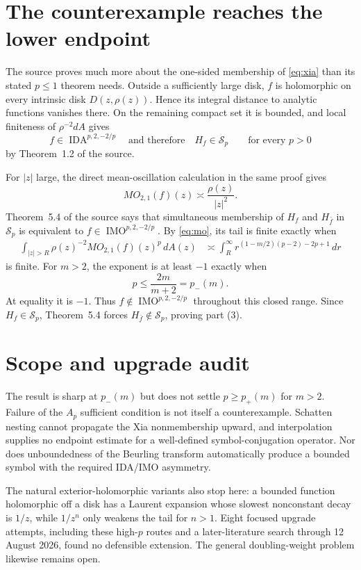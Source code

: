 \documentclass[11pt]{article}
\newcommand{\Sp}{\mathcal S}
\newcommand{\IMO}{\operatorname{IMO}}
\begin{document}
\section{The counterexample reaches the lower endpoint}

The source proves much more about the one-sided membership of
\eqref{eq:xia} than its stated $p\leq1$ theorem needs.  Outside a sufficiently
large disk, $f$ is holomorphic on every intrinsic disk
$D(z,\rho(z))$.  Hence its integral distance to analytic functions vanishes
there.  On the remaining compact set it is bounded, and local finiteness of
$\rho^{-2}dA$ gives
\[
 f\in\operatorname{IDA}^{p,2,-2/p}\quad\text{and therefore}\quad
 H_f\in\Sp_p
 \qquad\text{for every }p>0
\]
by Theorem~1.2 of the source.

For $|z|$ large, the direct mean-oscillation calculation in the same proof
gives
\begin{equation}\label{eq:mo}
 MO_{2,1}(f)(z)\asymp\frac{\rho(z)}{|z|^2}.
\end{equation}
Theorem~5.4 of the source says that simultaneous membership of $H_f$ and
$H_{\bar f}$ in $\Sp_p$ is equivalent to
$f\in\IMO^{p,2,-2/p}$.  By \eqref{eq:mo}, its tail is finite exactly when
\begin{align*}
 \int_{|z|>R}\rho(z)^{-2}MO_{2,1}(f)(z)^p\,dA(z)
 &\asymp \int_R^\infty
 r^{(1-m/2)(p-2)-2p+1}\,dr
\end{align*}
is finite.  For $m>2$, the exponent is at least $-1$ exactly when
\[
 p\leq\frac{2m}{m+2}=p_-(m).
\]
At equality it is $-1$.  Thus $f\notin\IMO^{p,2,-2/p}$ throughout this
closed range.  Since $H_f\in\Sp_p$, Theorem~5.4 forces
$H_{\bar f}\notin\Sp_p$, proving part (3).

\section{Scope and upgrade audit}

The result is sharp at $p_-(m)$ but does not settle $p\geq p_+(m)$ for
$m>2$.  Failure of the $A_p$ sufficient condition is not itself a
counterexample.  Schatten nesting cannot propagate the Xia nonmembership
upward, and interpolation supplies no endpoint estimate for a well-defined
symbol-conjugation operator.  Nor does unboundedness of the Beurling transform
automatically produce a bounded symbol with the required IDA/IMO asymmetry.

The natural exterior-holomorphic variants also stop here: a bounded function
holomorphic off a disk has a Laurent expansion whose slowest nonconstant
decay is $1/z$, while $1/z^n$ only weakens the tail for $n>1$.  Eight focused
upgrade attempts, including these high-$p$ routes and a later-literature
search through 12 August 2026, found no defensible extension.  The general
doubling-weight problem likewise remains open.
\end{document}
